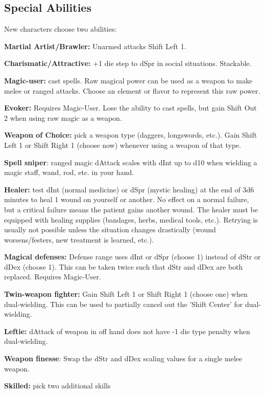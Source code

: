 \documentclass[10pt,twoside,twocolumn,openany]{book}
\begin{document}
\subsection{Special Abilities}
New characters choose two abilities:
\newline
\par \textbf{Martial Artist/Brawler:} Unarmed attacks Shift Left 1.
\par \textbf{Charismatic/Attractive:} +1 die step to dSpr in social situations. Stackable.
\par \textbf{Magic-user:} cast spells. Raw magical power can be used as a weapon to make melee or ranged attacks. Choose an element or flavor to represent this raw power.
\par \textbf{Evoker:} Requires Magic-User. Lose the ability to cast spells, but gain Shift Out 2 when using raw magic as a weapon.
\par \textbf{Weapon of Choice:} pick a weapon type (daggers, longswords, etc.). Gain Shift Left 1 or Shift Right 1 (choose now) whenever using a weapon of that type.
\par \textbf{Spell sniper}: ranged magic dAttack scales with dInt up to d10 when wielding a magic staff, wand, rod, etc. in your hand.
\par \textbf{Healer:} test dInt (normal medicine) or dSpr (mystic healing) at the end of 3d6 minutes to heal 1 wound on yourself or another. No effect on a normal failure, but a critical failure means the patient gains another wound. The healer must be equipped with healing supplies (bandages, herbs, medical tools, etc.). Retrying is usually not possible unless the situation changes drastically (wound worsens/festers, new treatment is learned, etc.).
\par \textbf{Magical defenses:} Defense range uses dInt or dSpr (choose 1) instead of dStr or dDex (choose 1). This can be taken twice such that dStr and dDex are both replaced. Requires Magic-User.
\par \textbf{Twin-weapon fighter:} Gain Shift Left 1 or Shift Right 1 (choose one) when dual-wielding. This can be used to partially cancel out the 'Shift Center' for dual-wielding.
\par \textbf{Leftie:} dAttack of weapon in off hand does not have -1 die type penalty when dual-wielding.
\par \textbf{Weapon finesse}: Swap the dStr and dDex scaling values for a single melee weapon.
\par \textbf{Skilled:} pick two additional skills
\end{document}
